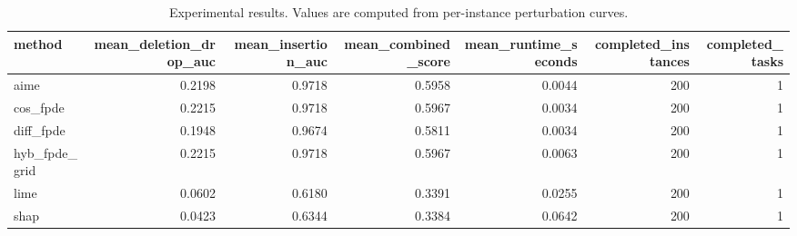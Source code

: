 \begin{table}[t]
\caption{Experimental results. Values are computed from per-instance perturbation curves.}
\label{tab:main_results_computed}
\centering
\begin{tabular}{lrrrrrr}
\toprule
method & mean\_deletion\_drop\_auc & mean\_insertion\_auc & mean\_combined\_score & mean\_runtime\_seconds & completed\_instances & completed\_tasks \\
\midrule
aime & 0.2198 & 0.9718 & 0.5958 & 0.0044 & 200 & 1 \\
cos\_fpde & 0.2215 & 0.9718 & 0.5967 & 0.0034 & 200 & 1 \\
diff\_fpde & 0.1948 & 0.9674 & 0.5811 & 0.0034 & 200 & 1 \\
hyb\_fpde\_grid & 0.2215 & 0.9718 & 0.5967 & 0.0063 & 200 & 1 \\
lime & 0.0602 & 0.6180 & 0.3391 & 0.0255 & 200 & 1 \\
shap & 0.0423 & 0.6344 & 0.3384 & 0.0642 & 200 & 1 \\
\bottomrule
\end{tabular}

\end{table}
